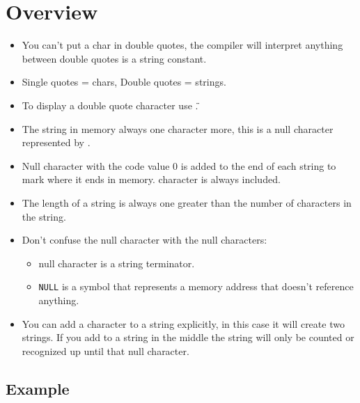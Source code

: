 \section{Overview}
\begin{itemize}
    \item You can't put a char in double quotes, the compiler will interpret anything between double quotes is a string constant. 
    \item Single quotes = chars, Double quotes = strings.
    \item To display a double quote character use \texttt{\"}.
    \item The string in memory always one character more, this is a null character represented by \texttt{\0}.
    \item Null character with the code value 0 is added to the end of each string to mark where it ends in memory. \texttt{\0} character is always included. 
    \item The length of a string is always one greater than the number of characters in the string. 
    \item Don't confuse the null character with the null characters: 
        \begin{itemize}
            \item null character is a string terminator. 
            \item \texttt{NULL} is a symbol that represents a memory address that doesn't reference anything. 
        \end{itemize}
    
    \item You can add a \texttt{\0} character to a string explicitly, in this case it will create two strings. If you add \texttt{\0} to a string in the middle the string will only be counted or recognized up until that null character. 
\end{itemize}
\subsection{Example}


